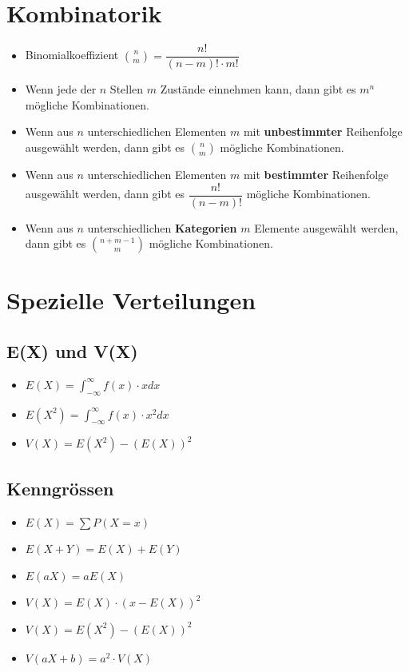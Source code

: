 \documentclass[8pt,a4paper]{scrartcl}
\begin{document}
\begin{multicols*}{3}
		\section{Kombinatorik}
			\begin{itemize}\itemsep0pt				
				\item Binomialkoeffizient ${n\choose m} = \dfrac{n!}{(n-m)!\cdot m!}$
				\item Wenn jede der $n$ Stellen $m$ Zustände einnehmen kann, dann gibt es $m^{n}$ mögliche Kombinationen.
				\item Wenn aus $n$ unterschiedlichen Elementen $m$ mit \textbf{unbestimmter} Reihenfolge ausgewählt werden, dann gibt es ${n\choose m}$ mögliche Kombinationen.
				\item Wenn aus $n$ unterschiedlichen Elementen $m$ mit  \textbf{bestimmter} Reihenfolge ausgewählt werden, dann gibt es $\dfrac{n!}{(n-m)!}$ mögliche Kombinationen.
				\item Wenn aus $n$ unterschiedlichen \textbf{Kategorien} $m$ Elemente ausgewählt werden, dann gibt es ${n+m-1\choose m}$ mögliche Kombinationen.
			\end{itemize}
			
		\section{Spezielle Verteilungen}
		
			\subsection{E(X) und V(X)}
				\begin{itemize}\itemsep0pt				
					\item $E(X) = \int_{-\infty}^{\infty} f(x)\cdot xdx$
					\item $E(X^{2})= \int_{-\infty}^{\infty} f(x)\cdot x^{2}dx$
					\item $V(X) = E(X^{2})-(E(X))^{2}$
				\end{itemize}
			
			\subsection{Kenngrössen}
				\begin{itemize}\itemsep0pt				
					\item $E(X) = \sum P(X=x)$
					\item $E(X+Y) = E(X) + E(Y)$
					\item $E(aX) = aE(X)$
					\item $V(X) = E(X) \cdot (x-E(X))^{2}$
					\item $V(X) = E(X^{2}) - (E(X))^{2}$
					\item $V(aX+b) = a^{2} \cdot V(X)$
				\end{itemize}
			

\end{multicols*}
\end{document}
